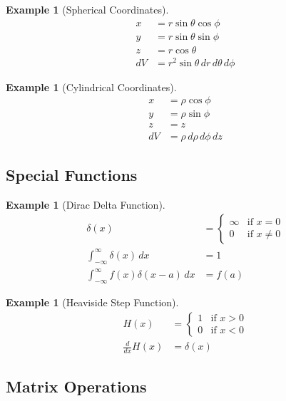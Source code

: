 \documentclass{article}
\newtheorem{example}[theorem]{Example}
\begin{document}
\begin{example}[Spherical Coordinates]
\begin{align*}
    x &= r\sin\theta\cos\phi \\
    y &= r\sin\theta\sin\phi \\
    z &= r\cos\theta \\
    dV &= r^2\sin\theta \, dr \, d\theta \, d\phi
\end{align*}
\end{example}

\begin{example}[Cylindrical Coordinates]
\begin{align*}
    x &= \rho\cos\phi \\
    y &= \rho\sin\phi \\
    z &= z \\
    dV &= \rho \, d\rho \, d\phi \, dz
\end{align*}
\end{example}

\subsection{Special Functions}

\begin{example}[Dirac Delta Function]
\begin{align*}
    \delta(x) &= \begin{cases}
        \infty & \text{if } x = 0 \\
        0 & \text{if } x \neq 0
    \end{cases} \\
    \int_{-\infty}^{\infty} \delta(x) \, dx &= 1 \\
    \int_{-\infty}^{\infty} f(x)\delta(x-a) \, dx &= f(a)
\end{align*}
\end{example}

\begin{example}[Heaviside Step Function]
\begin{align*}
    H(x) &= \begin{cases}
        1 & \text{if } x > 0 \\
        0 & \text{if } x < 0
    \end{cases} \\
    \frac{d}{dx}H(x) &= \delta(x)
\end{align*}
\end{example}

\subsection{Matrix Operations}
\end{document}
